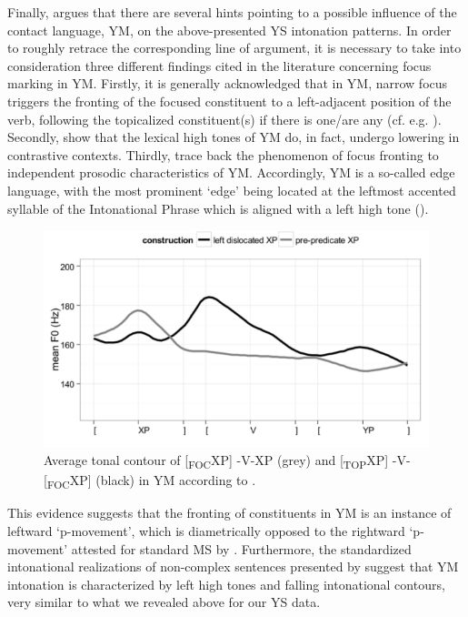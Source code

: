 \documentclass[output=paper]{langsci/langscibook}
\begin{document}
Finally, \citet{Uth17} argues that there are several hints pointing to a possible influence of the contact language, YM, on the above-presented YS intonation patterns. In order to roughly retrace the corresponding line of argument, it is necessary to take into consideration three different findings cited in the literature concerning focus marking in YM. Firstly, it is generally acknowledged that in YM, narrow focus triggers the fronting of the focused constituent to a left-adjacent position of the verb, following the topicalized constituent(s) if there is one/are any (cf. e.g. \citealt{Aissen92,Tonhauser03,GutierrezBravo08,Skopeteas12}). Secondly, \citet{KuglerSkopeteas07} show that the lexical high tones of YM do, in fact, undergo lowering in contrastive contexts. Thirdly, \citet{Verhoeven.2015} trace back the phenomenon of focus fronting to independent prosodic characteristics of YM. Accordingly, YM is a so-called edge language, with the most prominent ‘edge’ being located at the leftmost accented syllable of the Intonational Phrase which is aligned with a left high tone ().

\begin{figure}
\includegraphics[width=\textwidth]{figures/UTH-img34.png}
\caption{Average tonal contour of [\textsubscript{FOC}XP] -V-XP (grey) and [\textsubscript{TOP}XP] -V-[\textsubscript{FOC}XP] (black) in YM according to \citet{Verhoeven.2015}.}
\label{fig:uth:23}
\end{figure}

This evidence suggests that the fronting of constituents in YM is an instance of leftward ‘p-movement’, which is diametrically opposed to the rightward ‘p-movement’ attested for standard MS by \citet[169]{GutierrezBravoetal17}. Furthermore, the standardized intonational realizations of non-complex sen\-ten\-ces presented by \citet{Verhoeven.2015} suggest that YM intonation is characterized by left high tones and falling intonational contours, very similar to what we revealed above for our YS data.
\end{document}
